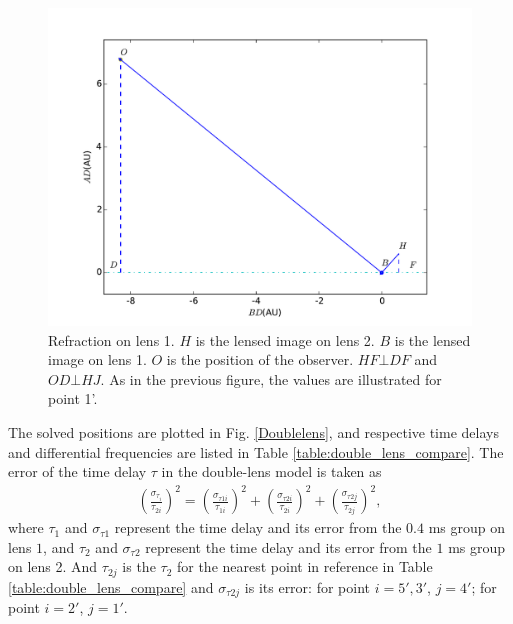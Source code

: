 \documentclass[useAMS,usenatbib]{mn2e}
\begin{document}
\begin{figure}
\centering
\includegraphics[width=1.0\linewidth]{Second_reflection.pdf}
\caption{Refraction on lens 1. 
$H$ is the lensed image on lens 2. $B$ is the lensed image on lens 1. $O$ is the position of the observer. $HF\bot DF$ and $OD\bot HJ$. As in the previous figure, the values are illustrated for point 1'. }
\label{second_reflect}
\end{figure}



The solved positions are plotted in Fig. \ref{Doublelens}, and
respective time delays and differential frequencies are listed in
Table \ref{table:double_lens_compare}. The error of the time delay $\tau$
in the double-lens model is taken as
\begin{equation}
\begin{aligned}
(\frac{\sigma_{\tau_i}}{\tau_{2i}})^2 = (\frac{\sigma_{\tau1i}}{\tau_{1i}})^2+(\frac{\sigma_{\tau2i}}{\tau_{2i}})^2 + (\frac{\sigma_{\tau2j}}{\tau_{2j}})^2,
\end{aligned}
\end{equation}
where $\tau_1$ and $\sigma_{\tau1}$ represent the time delay and its
error from the $0.4$ ms group on lens $1$, and $\tau_2$ and
$\sigma_{\tau2}$ represent the time delay and its error from
the $1$ ms group on lens 2. And $\tau_{2j}$ is the $\tau_2$ for
the nearest point in reference in Table
\ref{table:double_lens_compare} and $\sigma_{\tau2j}$ is its error:
for point $i=5',3'$, $j=4'$; for point $i=2'$, $j=1'$.
\end{document}

